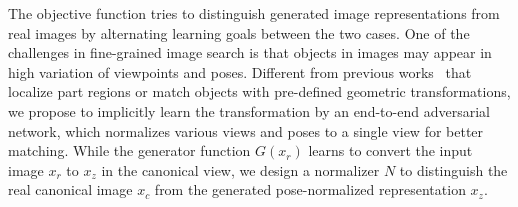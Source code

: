\documentclass[runningheads]{llncs}
\begin{document}
The objective function tries to distinguish generated image representations from real images by alternating learning goals between the two cases.
One of the challenges in fine-grained image search is that objects in images may appear in high variation of viewpoints and poses. 
Different from previous works~\cite{DBLP:conf/cvpr/KanazawaJC16,DBLP:journals/corr/HanRHWCSP17,zhang2014part,zhang2013deformable,chai2013symbiotic} that localize part regions or match objects with pre-defined geometric transformations, we propose to implicitly learn the transformation by an end-to-end adversarial network, which normalizes various views and poses to a single view for better matching. 
While the generator function $G(x_r)$ learns to convert the input image $x_r$ to $x_z$ in the canonical view, we design a normalizer $N$ to distinguish the real canonical image $x_c$ from the generated pose-normalized representation $x_z$. 
\end{document}

